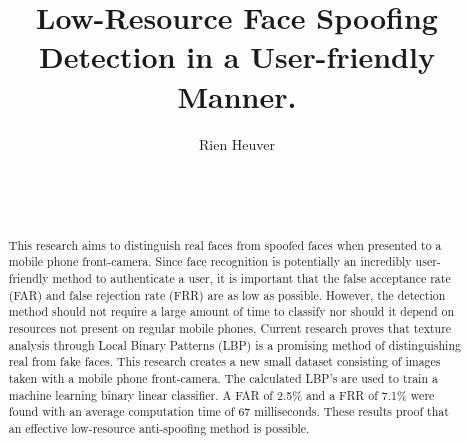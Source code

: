 \documentclass{sig-alternate-br}
\begin{document}
\title{Low-Resource Face Spoofing Detection in a User-friendly Manner.}



\author{
\alignauthor
Rien Heuver\\
       \\
       \\
       \\
}

\maketitle

\begin{abstract}
This research aims to distinguish real faces from spoofed faces when presented to a mobile phone front-camera. Since face recognition is potentially an incredibly user-friendly method to authenticate a user, it is important that the false acceptance rate (FAR) and false rejection rate (FRR) are as low as possible. However, the detection method should not require a large amount of time to classify nor should it depend on resources not present on regular mobile phones. Current research proves that texture analysis through Local Binary Patterns (LBP) is a promising method of distinguishing real from fake faces. This research creates a new small dataset consisting of images taken with a mobile phone front-camera. The calculated LBP's are used to train a machine learning binary linear classifier. A FAR of 2.5\% and a FRR of 7.1\% were found with an average computation time of 67 milliseconds. These results proof that an effective low-resource anti-spoofing method is possible.
\end{abstract}
\end{document}
